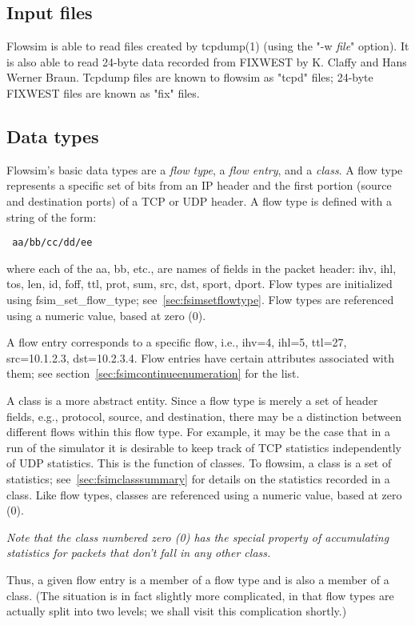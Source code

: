 \documentclass{article}
\begin{document}
\subsection{Input files}
Flowsim is able to read files created by tcpdump(1) (using the "-w
\emph{file}" option).  It is also able to read 24-byte data recorded
from FIXWEST by K. Claffy and Hans Werner Braun.  Tcpdump files are
known to flowsim as "tcpd" files; 24-byte FIXWEST files are known as
"fix" files.

\subsection{Data types}
Flowsim's basic data types are a \emph{flow type}, a \emph{flow entry},
and a \emph{class}.  A flow type represents a specific set of bits from
an IP header and the first portion (source and destination ports) of a
TCP or UDP header.  A flow type is defined with a string of the form:
\begin{verbatim} aa/bb/cc/dd/ee \end{verbatim}
where each of the aa, bb, etc., are names of fields in the packet
header: ihv, ihl, tos, len, id, foff, ttl, prot, sum, src, dst, sport,
dport.  Flow types are initialized using fsim\_set\_flow\_type;
see~\ref{sec:fsimsetflowtype}.  Flow types are referenced using a
numeric value, based at zero (0).

A flow entry corresponds to a specific flow, i.e., ihv=4, ihl=5,
ttl=27, src=10.1.2.3, dst=10.2.3.4.  Flow entries have certain
attributes associated with them; see
section~\ref{sec:fsimcontinueenumeration} for the list.

A class is a more abstract entity.  Since a flow type is merely a set
of header fields, e.g., protocol, source, and destination, there may be a
distinction between different flows within this flow type.  For
example, it may be the case that in a run of the simulator it is
desirable to keep track of TCP statistics independently of UDP
statistics.  This is the function of classes.  To flowsim, a class is a
set of statistics; see~\ref{sec:fsimclasssummary} for details on the
statistics recorded in a class.  Like flow types, classes are
referenced using a numeric value, based at zero (0).

\emph{Note that the class numbered zero (0) has the special property of
accumulating statistics for packets that don't fall in any other
class.}

Thus, a given flow entry is a member of a flow type and is also a
member of a class.  (The situation is in fact slightly more
complicated, in that flow types are actually split into two levels; we
shall visit this complication shortly.)
\end{document}
